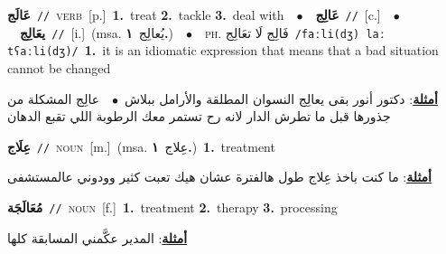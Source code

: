 \documentclass[10pt,a4paper,twoside]{article} %
\begin{document}
\begin{multicols}{2}
{\setlength\topsep{0pt}\textbf{\foreignlanguage{arabic}{عَالَج}}\ {\color{gray}\texttt{//}\color{black}}\ \textsc{verb}\ [p.]\ \textbf{1.}~treat  \textbf{2.}~tackle  \textbf{3.}~deal with\ \ $\bullet$\ \ \setlength\topsep{0pt}\textbf{\foreignlanguage{arabic}{عَالِج}}\ {\color{gray}\texttt{//}\color{black}}\ [c.]\ \ $\bullet$\ \ \setlength\topsep{0pt}\textbf{\foreignlanguage{arabic}{يعَالِج}}\ {\color{gray}\texttt{//}\color{black}}\ [i.]\ \color{gray}(msa. \foreignlanguage{arabic}{يُعالِج}~\foreignlanguage{arabic}{\textbf{١.}})\color{black}\ \ $\bullet$\ \ \textsc{ph.} \color{gray} \foreignlanguage{arabic}{فَالِج لَا تعَالِج}\color{black}\ {\color{gray}\texttt{/{\sffamily faːli(dʒ) laː tʕaːli(dʒ)}/}\color{black}}\ \textbf{1.}~it is an idiomatic expression that means that a bad situation cannot be changed\  \begin{flushright}\color{gray}\foreignlanguage{arabic}{\textbf{\underline{\foreignlanguage{arabic}{أمثلة}}}: دكتور أنور بقى يعالِج النسوان المطلقة والأرامل ببلاش\ $\bullet$\ \  عالِج المشكلة من جذورها قبل ما تطرش الدار لانه رح تستمر معك الرطوبة اللي تقبع الدهان}\end{flushright}\color{black}} \vspace{2mm}

{\setlength\topsep{0pt}\textbf{\foreignlanguage{arabic}{عِلَاج}}\ {\color{gray}\texttt{//}\color{black}}\ \textsc{noun}\ [m.]\ \color{gray}(msa. \foreignlanguage{arabic}{عِلاج}~\foreignlanguage{arabic}{\textbf{١.}})\color{black}\ \textbf{1.}~treatment\  \begin{flushright}\color{gray}\foreignlanguage{arabic}{\textbf{\underline{\foreignlanguage{arabic}{أمثلة}}}: ما كنت باخذ عِلاج طول هالفترة عشان هيك تعبت كثير وودوني عالمستشفى}\end{flushright}\color{black}} \vspace{2mm}

{\setlength\topsep{0pt}\textbf{\foreignlanguage{arabic}{مُعَالَجَة}}\ {\color{gray}\texttt{//}\color{black}}\ \textsc{noun}\ [f.]\ \textbf{1.}~treatment  \textbf{2.}~therapy  \textbf{3.}~processing\  \begin{flushright}\color{gray}\foreignlanguage{arabic}{\textbf{\underline{\foreignlanguage{arabic}{أمثلة}}}: المدير عكَّمني المسابقة كلها}\end{flushright}\color{black}} \vspace{2mm}


\end{multicols}
\end{document}
